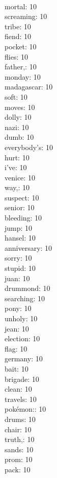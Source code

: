 \begin{multicols}{6}
  \\ mortal: 10
  \\ screaming: 10
  \\ tribe: 10
  \\ fiend: 10
  \\ pocket: 10
  \\ flies: 10
  \\ father,: 10
  \\ monday: 10
  \\ madagascar: 10
  \\ soft: 10
  \\ moves: 10
  \\ dolly: 10
  \\ nazi: 10
  \\ dumb: 10
  \\ everybody's: 10
  \\ hurt: 10
  \\ i've: 10
  \\ venice: 10
  \\ way,: 10
  \\ suspect: 10
  \\ senior: 10
  \\ bleeding: 10
  \\ jump: 10
  \\ hansel: 10
  \\ anniversary: 10
  \\ sorry: 10
  \\ stupid: 10
  \\ juan: 10
  \\ drummond: 10
  \\ searching: 10
  \\ pony: 10
  \\ unholy: 10
  \\ jean: 10
  \\ election: 10
  \\ flag: 10
  \\ germany: 10
  \\ bait: 10
  \\ brigade: 10
  \\ clean: 10
  \\ travels: 10
  \\ pokémon:: 10
  \\ drums: 10
  \\ chair: 10
  \\ truth,: 10
  \\ sands: 10
  \\ prom: 10
  \\ pack: 10

\end{multicols}
